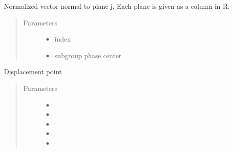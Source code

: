 \documentclass[letterpaper,12pt,english]{sphinxmanual}
\begin{document}
\begin{fulllineitems}
\label{\detokenize{functions:functions.nvec_j}}
Normalized vector normal to plane j. Each plane is given as a column in R.
\begin{quote}\begin{description}
\item[{Parameters}] \leavevmode\begin{itemize}
\item {} 
 \textendash{} index

\item {} 
 \textendash{} subgroup phase center

\end{itemize}

\end{description}\end{quote}

\end{fulllineitems}


\begin{fulllineitems}
\label{\detokenize{functions:functions.p0_jk}}
Displacement point
\begin{quote}\begin{description}
\item[{Parameters}] \leavevmode\begin{itemize}
\item {} 
 \textendash{} 

\item {} 
 \textendash{} 

\item {} 
 \textendash{} 

\item {} 
 \textendash{} 

\item {} 
 \textendash{} 

\end{itemize}

\end{description}\end{quote}

\end{fulllineitems}
\end{document}
